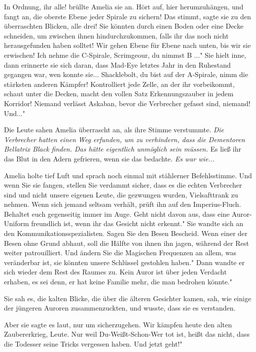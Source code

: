 \glqq In Ordnung, ihr alle!\grqq{} brüllte Amelia sie an. \glqq Hört auf, hier
herumzuhängen, und fangt an, die oberste Ebene jeder Spirale zu sichern! Das
stimmt\grqq{}, sagte sie zu den überraschten Blicken, \glqq alle drei! Sie
könnten durch einen Boden oder eine Decke schneiden, um zwischen ihnen
hindurchzukommen, falls ihr das noch nicht herausgefunden haben solltet! Wir
gehen Ebene für Ebene nach unten, bis wir sie erwischen! Ich nehme die
C-Spirale, Scrimgeour, du nimmst B ..." Sie hielt inne, dann erinnerte sie sich
daran, dass Mad-Eye letztes Jahr in den Ruhestand gegangen war, wen konnte
sie... \glqq Shacklebolt, du bist auf der A-Spirale, nimm die stärksten anderen
Kämpfer! Kontrolliert jede Zelle, an der ihr vorbeikommt, schaut unter die
Decken, macht den vollen Satz Erkennungszauber in jedem Korridor! Niemand
verlässt Askaban, bevor die Verbrecher gefasst sind, niemand! Und..."

Die Leute sahen Amelia überrascht an, als ihre Stimme verstummte. \emph{Die
Verbrecher hatten einen Weg erfunden, um zu verhindern, dass die Dementoren
Bellatrix Black finden. Das hätte eigentlich unmöglich sein müssen.} Es ließ ihr
das Blut in den Adern gefrieren, wenn sie das bedachte. \emph{Es war wie...}

Amelia holte tief Luft und sprach noch einmal mit stählerner Befehlsstimme.
\glqq Und wenn Sie sie fangen, stellen Sie verdammt sicher, dass es die echten
Verbrecher sind und nicht unsere eigenen Leute, die gezwungen wurden,
Vielsafttrank zu nehmen. Wenn sich jemand seltsam verhält, prüft ihn auf den
Imperius-Fluch. Behaltet euch gegenseitig immer im Auge. Geht nicht davon aus,
dass eine Auror-Uniform freundlich ist, wenn ihr das Gesicht nicht erkennt." Sie
wandte sich an den Kommunikationsspezialisten. \glqq Sagen Sie den Besen
Bescheid. Wenn einer der Besen ohne Grund abhaut, soll die Hälfte von ihnen ihn
jagen, während der Rest weiter patrouilliert. Und ändern Sie die Magischen
Frequenzen an allem, was veränderbar ist, sie könnten unsere Schlüssel gestohlen
haben." Dann wandte er sich wieder dem Rest des Raumes zu. \glqq Kein Auror ist
über jeden Verdacht erhaben, es sei denn, er hat keine Familie mehr, die man
bedrohen könnte."

Sie sah es, die kalten Blicke, die über die älteren Gesichter kamen, sah, wie
einige der jüngeren Auroren zusammenzuckten, und wusste, dass sie es verstanden.

Aber sie sagte es laut, nur um sicherzugehen. \glqq Wir kämpfen heute den alten
Zaubererkrieg, Leute. Nur weil Du-Weißt-Schon-Wer tot ist, heißt das nicht, dass
die Todesser seine Tricks vergessen haben. Und jetzt geht!"


